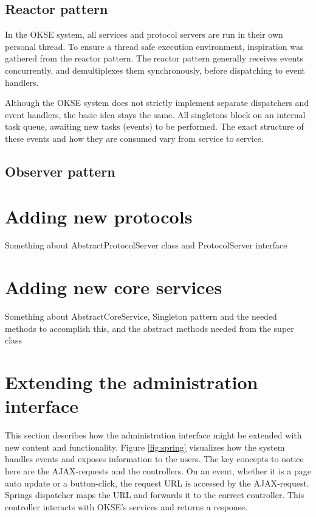 \subsection{Reactor pattern}

In the OKSE system, all services and protocol servers are run in their own personal thread. To ensure a thread safe execution environment, inspiration was gathered from the reactor pattern. The reactor pattern generally receives events concurrently, and demultiplexes them synchronously, before dispatching to event handlers.

Although the OKSE system does not strictly implement separate dispatchers and event handlers, the basic idea stays the same. All singletons block on an internal task queue, awaiting new tasks (events) to be performed. The exact structure of these events and how they are consumed vary from service to service. 

\subsection{Observer pattern}

\section{Adding new protocols}
\label{sec:adding-new-protocols}

Something about AbstractProtocolServer class and ProtocolServer interface

\section{Adding new core services}
\label{sec:adding-new-core-services}

Something about AbstractCoreService, Singleton pattern and the needed methods to accomplish this, and the abstract methods needed from the super class

\section{Extending the administration interface}
\label{sec:adding-new-panes}

This section describes how the administration interface might be extended with new content and functionality. Figure \ref{fig:spring} visualizes how the system handles events and exposes information to the users. The key concepts to notice here are the AJAX-requests and the controllers. On an event, whether it is a page auto update or a button-click, the request URL is accessed by the AJAX-request. Springs dispatcher maps the URL and forwards it to the correct controller. This controller interacts with OKSE's services and returns a response.

